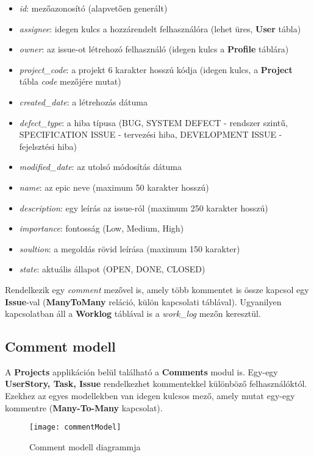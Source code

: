 \begin{itemize}
	\item \textit{id}: mezőazonosító (alapvetően generált)
	\item \textit{assignee}: idegen kulcs a hozzárendelt felhasználóra (lehet üres, \textbf{User} tábla)
	\item \textit{owner}: az issue-ot létrehozó felhasználó (idegen kulcs a \textbf{Profile} táblára)
	\item \textit{project\_code}: a projekt 6 karakter hosszú kódja (idegen kulcs, a \textbf{Project} tábla \textit{code} mezőjére mutat)
	\item \textit{created\_date}: a létrehozás dátuma
	\item \textit{defect\_type}: a hiba típusa (BUG, SYSTEM DEFECT - rendszer szintű, SPECIFICATION ISSUE - tervezési hiba, DEVELOPMENT ISSUE - fejelsztési hiba)
	\item \textit{modified\_date}: az utolsó módosítás dátuma
	\item \textit{name}: az epic neve (maximum 50 karakter hosszú)
	\item \textit{description}: egy leírás az issue-ról (maximum 250 karakter hosszú)
	\item \textit{importance}: fontosság (Low, Medium, High)
	\item \textit{soultion}: a megoldás rövid leírása (maximum 150 karakter)
	\item \textit{state}: aktuális állapot (OPEN, DONE, CLOSED)
\end{itemize}

Rendelkezik egy \textit{comment} mezővel is, amely több kommentet is össze kapcsol egy \textbf{Issue}-val (\textbf{ManyToMany} reláció, külön kapcsolati táblával). Ugyanilyen kapcsolatban áll a \textbf{Worklog} táblával is a \textit{work\_log} mezőn keresztül.

\subsection{Comment modell}

A \textbf{Projects} applikáción belül található a \textbf{Comments} modul is. Egy-egy \textbf{UserStory, Task, Issue} rendelkezhet kommentekkel különböző felhasználóktól. Ezekhez az egyes modellekben van idegen kulcsos mező, amely mutat egy-egy kommentre (\textbf{Many-To-Many} kapcsolat). 

\begin{figure}[H]
	\centering
	\texttt{[image: commentModel]}
	\caption{Comment modell diagrammja}
	\label{fig:commentModel}
\end{figure}


